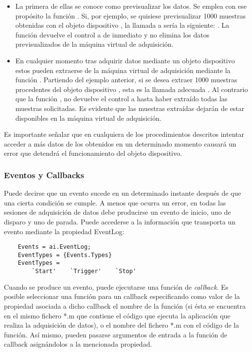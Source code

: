 \begin{itemize}
	\item La primera de ellas se conoce como previsualizar los datos.
		Se emplea con ese propósito la función . Si,
		por ejemplo, se quisiese previsualizar 1000 muestras
		obtenidas con el objeto dispositivo , la
		llamada a  sería la siguiente: . La función 
		devuelve el control a \matlab{} de inmediato y no elimina
		los datos previsualizados de la máquina virtual de
		adquisición.
	\item En cualquier momento tras adquirir datos mediante un objeto
		dispositivo estos pueden extraerse de la máquina virtual de
		adquisición mediante la función . Partiendo
		del ejemplo anterior, si se desea extraer 1000 muestras
		procedentes del objeto dispositivo , esta es
		la llamada adecuada . Al
		contrario que la función ,  no
		devuelve el control a \matlab{} hasta haber extraído todas
		las muestras solicitadas. Es evidente que las muestras
		extraídas dejarán de estar disponibles en la máquina
		virtual de adquisición.
\end{itemize}

Es importante señalar que en cualquiera de los procedimientos descritos
intentar acceder a más datos de los obtenidos en un determinado momento
causará un error que detendrá el funcionamiento del objeto dispositivo.


\subsubsection{Eventos y Callbacks}

Puede decirse que un evento sucede en un determinado instante después de
que una cierta condición se cumple. A menos que ocurra un error, en todas
las sesiones de adquisición de datos debe producirse un evento de inicio,
uno de disparo y uno de parada. Puede accederse a la información que
transporta un evento mediante la propiedad \textsf{EventLog}:

\begin{lstlisting}
	Events = ai.EventLog;
	EventTypes = {Events.Types}
	EventTypes =
		`Start'    `Trigger'	`Stop'
\end{lstlisting}

Cuando se produce un evento, puede ejecutarse una función de
\emph{callback}. Es posible seleccionar una función para un callback
especificando como valor de la propiedad asociada a dicho callback el
nombre de la función (si ésta se encuentra en el mismo fichero *.m que
contiene el código que ejecuta la aplicación que realiza la adquisición de
datos), o el nombre del fichero *.m con el código de la función. Así mismo,
pueden pasarse argumentos de entrada a la función de callback asignándolos
a la mencionada propiedad.


